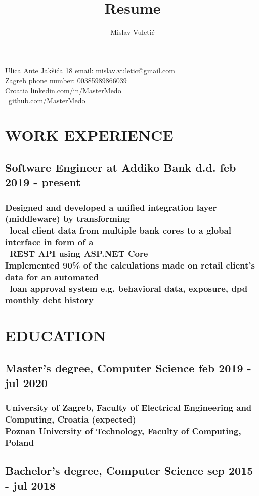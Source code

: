 \documentclass{article}
\begin{document}
\title{Resume}
\author{Mislav Vuletić}

\noindent \Huge\bfseries\theauthor\mdseries\large

\noindent Ulica Ante Jakšića 18 \hfill email: mislav.vuletic@gmail.com
\\ Zagreb \hfill phone number: 00385989866039
\\\noindent Croatia \hfill linkedin.com/in/MasterMedo
\\\-\ \hfill github.com/MasterMedo

\section{WORK EXPERIENCE} 
\subsection{Software Engineer at Addiko Bank d.d. \hfill feb 2019 - present}
\subsubsection{Designed and developed a unified integration layer (middleware) by transforming
	\\\-\ \quad local client data from multiple bank cores to a global interface in form of a
	\\\-\ \quad REST API using ASP.NET Core
	\\Implemented 90\% of the calculations made on retail client's data for an automated
	\\\-\ \quad loan approval system e.g. behavioral data, exposure, dpd monthly debt history}

\section{EDUCATION}
\subsection{Master's degree, Computer Science \hfill feb 2019 - jul 2020}
\subsubsection{University of Zagreb, Faculty of Electrical Engineering and Computing, Croatia \hfill (expected)
	\\Poznan University of Technology, Faculty of Computing, Poland}
\subsection{Bachelor's degree, Computer Science \hfill sep 2015 - jul 2018}
\end{document}
